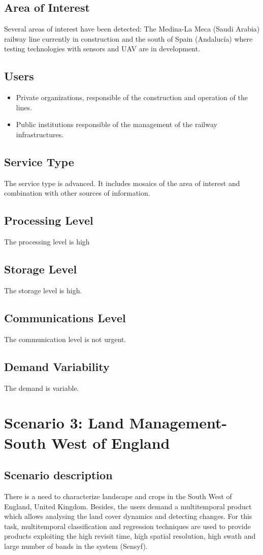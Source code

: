 \subsection{Area of Interest}
Several areas of interest have been detected: The Medina-La Meca (Saudi Arabia) railway line currently in construction and the south of Spain (Andalucía) where testing technologies with sensors and \ac{UAV} are in development.
\subsection{Users}
\begin{itemize}
\item Private organizations, responsible of the construction and operation of the lines.
\item Public institutions responsible of the management of the railway
  infrastructures.
\end{itemize}

\subsection{Service Type}
The service type is advanced. It includes mosaics of the area of interest and combination with other sources of information.
\subsection{Processing Level}
The processing level is high
\subsection{Storage Level}
The storage level is high.
\subsection{Communications Level}
The communication level is not urgent.
\subsection{Demand Variability}
The demand is variable.

\section{Scenario 3: Land Management-South West of England}

\subsection{Scenario description}
There is a need to characterize landscape and crops in the South West of England, United Kingdom. Besides, the users demand a multitemporal product which allows analysing the land cover dynamics and detecting changes. For this task, multitemporal classification and regression techniques are used to provide products exploiting the high revisit time, high spatial resolution, high swath and large number of bands in the system (Sensyf).
